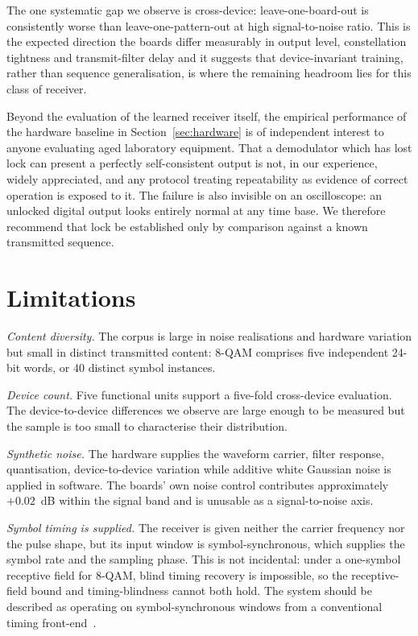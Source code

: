 \documentclass[journal]{IEEEtran}   %
\begin{document}
The one systematic gap we observe is cross-device: leave-one-board-out is
consistently worse than leave-one-pattern-out at high signal-to-noise ratio.
This is the expected direction the boards differ measurably in output level,
constellation tightness and transmit-filter delay and it suggests that
device-invariant training, rather than sequence generalisation, is where the
remaining headroom lies for this class of receiver.

Beyond the evaluation of the learned receiver itself, the empirical performance of the hardware baseline in  
Section~\ref{sec:hardware} is of independent
interest to anyone evaluating aged laboratory equipment. That a demodulator
which has lost lock can present a perfectly self-consistent output is not, in
our experience, widely appreciated, and any protocol treating repeatability as
evidence of correct operation is exposed to it. The failure is also invisible on
an oscilloscope: an unlocked digital output looks entirely normal at any time
base. We therefore recommend that lock be established only by comparison against
a known transmitted sequence.

\section{Limitations}
\label{sec:limitations}

\emph{Content diversity.} The corpus is large in noise realisations and hardware
variation but small in distinct transmitted content: 8-QAM comprises five
independent 24-bit words, or 40 distinct symbol instances.

\emph{Device count.} Five functional units support a five-fold cross-device
evaluation. The device-to-device differences we observe are large enough to be
measured but the sample is too small to characterise their distribution.

\emph{Synthetic noise.} The hardware supplies the waveform carrier, filter
response, quantisation, device-to-device variation while additive white
Gaussian noise is applied in software. The boards' own noise control contributes
approximately $+0.02$~dB within the signal band and is unusable as a
signal-to-noise axis.

\emph{Symbol timing is supplied.} The receiver is given neither the carrier
frequency nor the pulse shape, but its input window is symbol-synchronous, which
supplies the symbol rate and the sampling phase. This is not incidental: under a
one-symbol receptive field for 8-QAM, blind timing recovery is impossible, so
the receptive-field bound and timing-blindness cannot both hold. The system
should be described as operating on symbol-synchronous windows from a
conventional timing front-end~\cite{gardner1986ted}.
\end{document}
